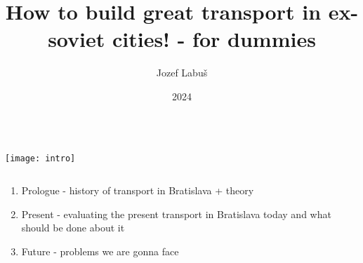 \documentclass{beamer}
\title{\textcolor{LegoBlueprintBlack}{\textbf{How to build great transport in ex-soviet cities!} - for dummies}}
\author{Jozef Labuš}
\date{2024}
\begin{document}
\begin{frame}[plain, label=current]
\transfade
{}
\end{frame}

\begin{frame}[plain]
	\begin{columns}
		\begin{column}{0.5\textwidth}
			\texttt{[image: intro]}
		\end{column}
		\begin{column}{0.5\textwidth}
			\titlepage
		\end{column}
	\end{columns}
\end{frame}

\begin{frame}
	\begin{enumerate}
		\item Prologue - history of transport in Bratislava + theory
		\item Present - evaluating the present transport in Bratislava today and what should be done about it
		\item Future - problems we are gonna face

	\end{enumerate}
\end{frame}




\end{document}
